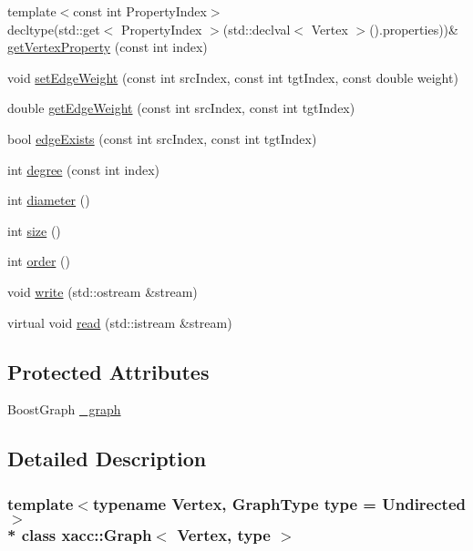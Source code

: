\begin{DoxyCompactItemize}
\item 
{\footnotesize template$<$const int Property\+Index$>$ }\\decltype(std\+::get$<$ Property\+Index $>$(std\+::declval$<$ Vertex $>$().properties))\& \hyperlink{a00136_a394f58c21a234393f08b4c3a565a5940}{get\+Vertex\+Property} (const int index)
\item 
void \hyperlink{a00136_aaf1edd0f038f6cca1c3c9ece35d3ec05}{set\+Edge\+Weight} (const int src\+Index, const int tgt\+Index, const double weight)
\item 
double \hyperlink{a00136_a917e439598a91ace852ad67bba029f5c}{get\+Edge\+Weight} (const int src\+Index, const int tgt\+Index)
\item 
bool \hyperlink{a00136_acb5a6e586e58dbef53d84631134a1cdf}{edge\+Exists} (const int src\+Index, const int tgt\+Index)
\item 
int \hyperlink{a00136_afd0f6cc800e0d81f8c168d47c927cf02}{degree} (const int index)
\item 
int \hyperlink{a00136_a9da48591a9d5ec658ae8c62204821ea7}{diameter} ()
\item 
int \hyperlink{a00136_ae3138d390f1d1c7d335144b59df2ddac}{size} ()
\item 
int \hyperlink{a00136_a50fca47e555122b5bb72e93e719484b4}{order} ()
\item 
void \hyperlink{a00136_a56dbba0529135ffdebb4ac3fbdb69252}{write} (std\+::ostream \&stream)
\item 
virtual void \hyperlink{a00136_abdd3e67dc08c223821d809bc8914164a}{read} (std\+::istream \&stream)
\end{DoxyCompactItemize}
\subsection*{Protected Attributes}
\begin{DoxyCompactItemize}
\item 
Boost\+Graph \hyperlink{a00136_acc3a072e3a30cdb8107b571170d96694}{\+\_\+graph}
\end{DoxyCompactItemize}


\subsection{Detailed Description}
\subsubsection*{template$<$typename Vertex, Graph\+Type type = Undirected$>$\\*
class xacc\+::\+Graph$<$ Vertex, type $>$}

